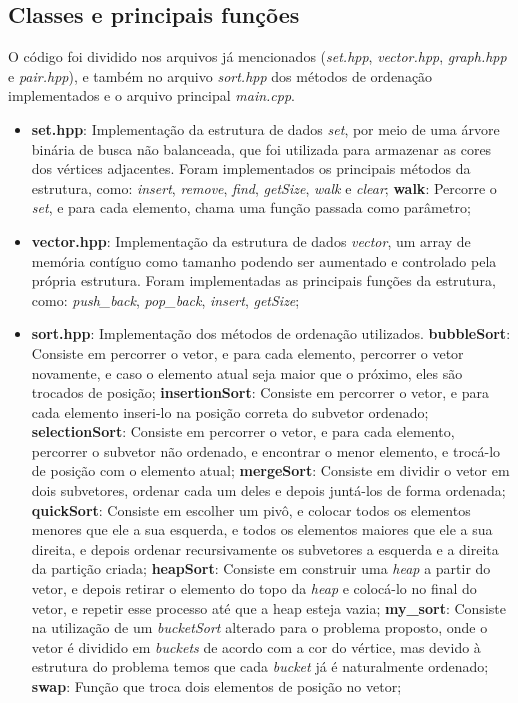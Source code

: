 \documentclass{article}
\begin{document}
\subsection{Classes e principais funções}
O código foi dividido nos arquivos já mencionados (\emph{set.hpp}, \emph{vector.hpp}, \emph{graph.hpp} e \emph{pair.hpp}), e também no arquivo \emph{sort.hpp} dos métodos de ordenação implementados e o arquivo principal \emph{main.cpp}.
\begin{itemize}
    \item \textbf{set.hpp}: Implementação da estrutura de dados \emph{set}, por meio de uma árvore binária de busca não balanceada, que foi utilizada para armazenar as cores dos vértices adjacentes. Foram implementados os principais métodos da estrutura, como: \emph{insert}, \emph{remove}, \emph{find}, \emph{getSize}, \emph{walk} e \emph{clear};
        \subitem \textbf{walk}: Percorre o \emph{set}, e para cada elemento, chama uma função passada como parâmetro;

    \item \textbf{vector.hpp}: Implementação da estrutura de dados \emph{vector}, um array de memória contíguo como tamanho podendo ser aumentado e controlado pela própria estrutura. Foram implementadas as principais funções da estrutura, como: \emph{push\_back}, \emph{pop\_back}, \emph{insert},  \emph{getSize};

    \item \textbf{sort.hpp}: Implementação dos métodos de ordenação utilizados.
        \subitem \textbf{bubbleSort}: Consiste em percorrer o vetor, e para cada elemento, percorrer o vetor novamente, e caso o elemento atual seja maior que o próximo, eles são trocados de posição;
        \subitem \textbf{insertionSort}: Consiste em percorrer o vetor, e para cada elemento inseri-lo na posição correta do subvetor ordenado;
        \subitem \textbf{selectionSort}: Consiste em percorrer o vetor, e para cada elemento, percorrer o subvetor não ordenado, e encontrar o menor elemento, e trocá-lo de posição com o elemento atual;
        \subitem \textbf{mergeSort}: Consiste em dividir o vetor em dois subvetores, ordenar cada um deles e depois juntá-los de forma ordenada;
        \subitem \textbf{quickSort}: Consiste em escolher um pivô, e colocar todos os elementos menores que ele a sua esquerda, e todos os elementos maiores que ele a sua direita, e depois ordenar recursivamente os subvetores a esquerda e a direita da partição criada;
        \subitem \textbf{heapSort}: Consiste em construir uma \emph{heap} a partir do vetor, e depois retirar o elemento do topo da \emph{heap} e colocá-lo no final do vetor, e repetir esse processo até que a heap esteja vazia;
        \subitem \textbf{my\_sort}: Consiste na utilização de um \emph{bucketSort} alterado para o problema proposto, onde o vetor é dividido em \emph{buckets} de acordo com a cor do vértice, mas devido à estrutura do problema temos que cada \emph{bucket} já é naturalmente ordenado; 
        \subitem \textbf{swap}: Função que troca dois elementos de posição no vetor;
    

\end{itemize}
\end{document}
